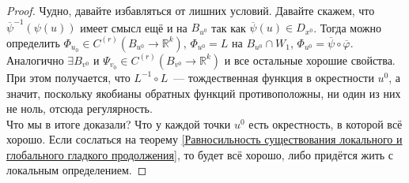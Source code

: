 \documentclass{article}
\let\tmp\varphi
\let\varphi\phi
\let\phi\tmp
\begin{document}
\begin{proof}
        Чудно, давайте избавляться от лишних условий. Давайте скажем, что ${\overline\psi}^{-1}(\psi(u))$ имеет смысл ещё и на $B_{u^0}$ так как $\overline\psi(u)\in D_{x^0}$. Тогда можно определить $\Phi_{u_0}\in C^{(r)}(B_{u^0}\to\mathbb R^k)$, $\Phi_{u^0}=L$ на $B_{u^0}\cap W_1$, $\Phi_{u^0}={\overline\psi}\circ\overline\phi$.\\
        Аналогично $\exists B_{v^0}$ и $\Psi_{v_0}\in C^{(r)}(B_{v^0}\to\mathbb R^k)$ и все остальные хорошие свойства. При этом получается, что $L^{-1}\circ L$~--- тождественная функция в окрестности $u^0$, а значит, поскольку якобианы обратных функций противоположны, ни один из них не ноль, отсюда регулярность.\\
        Что мы в итоге доказали? Что у каждой точки $u^0$ есть окрестность, в которой всё хорошо. Если сослаться на теорему \ref{Равносильность существования локального и глобального гладкого продолжения}, то будет всё хорошо, либо придётся жить с локальным определением.
    \end{proof}
\end{document}
